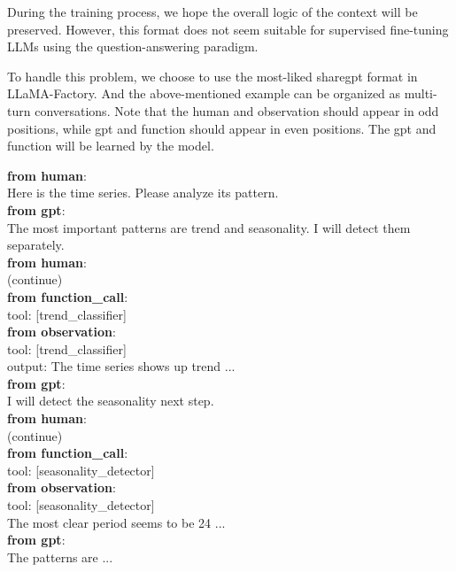 During the training process, we hope the overall logic of the context will be preserved. However, this format does not seem suitable for supervised fine-tuning LLMs using the question-answering paradigm. 

To handle this problem, we choose to use the most-liked sharegpt format in LLaMA-Factory. And the above-mentioned example can be organized as multi-turn conversations. Note that the human and observation should appear in odd positions, while gpt and function should appear in even positions. The gpt and function will be learned by the model.

\begin{tcolorbox}[
  colback=white,
  colframe=black!50,
  boxrule=0.3mm,
  width=\columnwidth,
  rounded corners,
  title=sharegpt format,
  fonttitle=\bfseries,
  left=2mm, right=2mm, top=2mm, bottom=2mm
]
\textbf{from human}:\\
Here is the time series. Please analyze its pattern.\\

\textbf{from gpt}:\\
The most important patterns are trend and seasonality. I will detect them separately.\\

\textbf{from human}:\\
(continue)\\

\textbf{from function\_call}:\\
tool: [trend\_classifier]\\

\textbf{from observation}:\\
tool: [trend\_classifier]\\
output: The time series shows up trend ...\\

\textbf{from gpt}:\\
I will detect the seasonality next step. \\

\textbf{from human}:\\
(continue)\\

\textbf{from function\_call}:\\
tool: [seasonality\_detector]\\

\textbf{from observation}:\\
tool: [seasonality\_detector]\\
The most clear period seems to be 24 ... \\

\textbf{from gpt}:\\
The patterns are ...
\end{tcolorbox}



